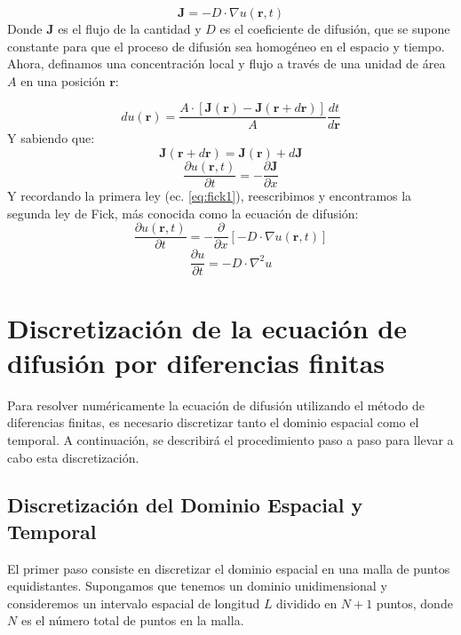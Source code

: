 \documentclass{article}
\begin{document}
\begin{equation}
    \textbf{J} = -D \cdot \nabla u(\textbf{r},t)
    \label{eq:fick1}
\end{equation}
Donde $\textbf{J}$ es el flujo de la cantidad y $D$ es el coeficiente de difusión, que se supone constante para que el proceso de difusión sea homogéneo en el espacio y tiempo. \\

Ahora, definamos una concentración local y flujo a través de una unidad de área $A$ en una posición $\textbf{r}$:

\begin{equation}
    du(\textbf{r}) = \frac{A \cdot [\textbf{J}(\textbf{r})-\textbf{J}(\textbf{r}+d\textbf{r})]}{A} \frac{dt}{d\textbf{r}}
\end{equation}
Y sabiendo que:
\begin{equation*}
    \textbf{J}(\textbf{r}+d\textbf{r}) = \textbf{J}(\textbf{r}) + d\textbf{J}
\end{equation*}
\begin{equation}
    \frac{\partial u(\textbf{r},t)}{\partial t} = -\frac{\partial \textbf{J}}{\partial x}
\end{equation}
Y recordando la primera ley (ec. \ref{eq:fick1}), reescribimos y encontramos la segunda ley de Fick, más conocida como la ecuación de difusión:
\begin{equation}
    \frac{\partial u(\textbf{r},t)}{\partial t} = -\frac{\partial }{\partial x} \left [ -D \cdot \nabla u(\textbf{r},t) \right ]
\end{equation}
\begin{equation}
    \frac{\partial u}{\partial t} = -D \cdot \nabla^2 u
    \label{eq:difusion}
\end{equation}


\section{Discretización de la ecuación de difusión por diferencias finitas}
Para resolver numéricamente la ecuación de difusión utilizando el método de diferencias finitas, es necesario discretizar tanto el dominio espacial como el temporal. A continuación, se describirá el procedimiento paso a paso para llevar a cabo esta discretización.

\subsection{Discretización del Dominio Espacial y Temporal}
El primer paso consiste en discretizar el dominio espacial en una malla de puntos equidistantes. Supongamos que tenemos un dominio unidimensional y consideremos un intervalo espacial de longitud \(L\) dividido en \(N+1\) puntos, donde \(N\) es el número total de puntos en la malla.
\end{document}
